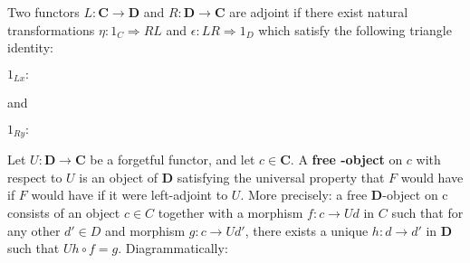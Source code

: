 \documentclass[tikz]{beamer}
\theoremstyle{definition}
\newcommand{\cat}[1]{\mathbf{#1}}
\begin{document}
\begin{frame}[fragile]
   
   \begin{definition}
    Two functors $L: \cat{C} \to \cat{D}$ and $R : \cat{D} \to \cat{C}$ are adjoint if there exist natural transformations $\eta : 1_C \Rightarrow RL $ and $\epsilon : LR \Rightarrow 1_D$ which satisfy the following triangle identity: 
    
    \begin{center}
        $1_{Lx}:$ 
    \end{center}
    
    and 
    \begin{center}
        $1_{Ry}:$ 
    \end{center}
   \end{definition}

\end{frame}

\begin{frame}[fragile]

Let $U: \cat{D} \to \cat{C}$ be a forgetful functor, and let $c \in \cat{C}$. A \textbf{free \cat{D}-object} on $c$ with respect to $U$
is an object of $\cat{D}$ satisfying the universal property that $F$ would have if $F$ would have if it were left-adjoint to $U$. More precisely: a free $\cat{D}$-object on c consists of an object $c \in C$ together with a morphism $f:c \to Ud$ in $C$ such that for any other $d' \in D$ and morphism $g:c \to Ud'$, there exists a unique $h:d \to d'$ in $\cat{D}$ such that $Uh \circ f = g$. Diagrammatically: 

\begin{center}
\end{center}
\end{frame}
\end{document}
